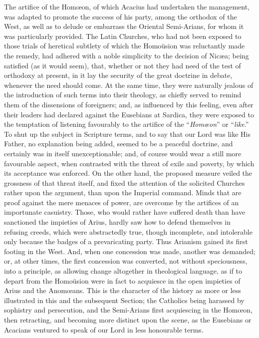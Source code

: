 The artifice of the Homœon, of which Acacius had undertaken the
management, was adapted to promote the success of his party, among the
orthodox of the West, as well as to delude or embarrass the Oriental
Semi-Arians, for whom it was particularly provided. The Latin
Churches, who had not been exposed to those trials of heretical
subtlety of which the Homoüsion was reluctantly made the
remedy, had adhered with a noble simplicity to the decision of Nicæa;
being satisfied (as it would seem), that, whether or not they had need
of the test of orthodoxy at present, in it lay the security of the
great doctrine in debate, whenever the need should come. At the same
time, they were naturally jealous of the introduction of such terms
into their theology, as chiefly served to remind them of the
dissensions of foreigners; and, as influenced by this feeling, even
after their leaders had declared against the Eusebians at Sardica,
they were exposed to the temptation of listening favourably to the
artifice of the ``\emph{Homœon}'' or ``\emph{like}.''
To shut up the subject in Scripture terms, and to say that our Lord
was like His Father, no explanation being added, seemed to be a
peaceful doctrine, and certainly was in itself unexceptionable; and,
of course would wear a still more favourable aspect, when contrasted
with the threat of exile and poverty, by which its acceptance was
enforced. On the other hand, the proposed measure veiled the grossness
of that threat itself, and fixed the attention of the solicited
Churches rather upon the argument, than upon the Imperial command.
Minds that are proof against the mere menaces of power, are overcome
by the artifices of an importunate casuistry. Those, who would rather
have suffered death than have sanctioned the impieties of Arius,
hardly saw how to defend themselves in refusing creeds, which were
abstractedly true, though incomplete, and intolerable only because the
badges of a prevaricating party. Thus Arianism gained its first
footing in the West. And, when one concession was made, another was
demanded; or, at other times, the first concession was
converted, not without speciousness, into a principle, as allowing
change altogether in theological language, as if to depart from the
Homoüsion were in fact to acquiesce in the open impieties of Arius
and the Anomœans. This is the character of the history as more or
less illustrated in this and the subsequent Section; the Catholics
being harassed by sophistry and persecution, and the Semi-Arians first
acquiescing in the Homœon, then retracting, and becoming more
distinct upon the scene, as the Eusebians or Acacians ventured to
speak of our Lord in less honourable terms.

